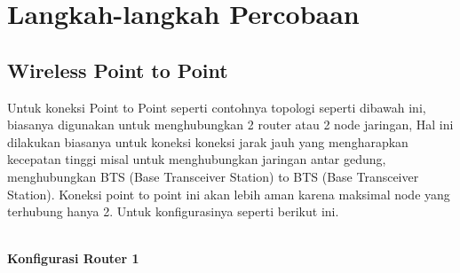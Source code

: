 \section{Langkah-langkah Percobaan}

\subsection{Wireless Point to Point}
Untuk koneksi Point to Point seperti contohnya topologi seperti dibawah ini, biasanya digunakan untuk
menghubungkan 2 router atau 2 node jaringan, Hal ini dilakukan biasanya untuk koneksi koneksi
jarak jauh yang mengharapkan kecepatan tinggi misal untuk menghubungkan jaringan antar gedung,
menghubungkan BTS (Base Transceiver Station) to BTS (Base Transceiver Station). Koneksi point
to point ini akan lebih aman karena maksimal node yang terhubung hanya 2. Untuk konfigurasinya
seperti berikut ini.\\ \\

\begin{center} 
	\textbf{Konfigurasi Router 1}
\end{center}

